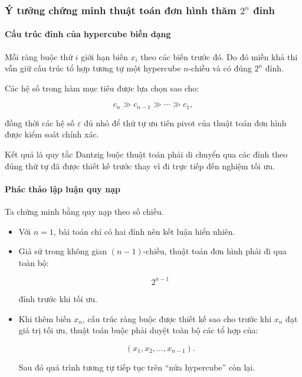 \documentclass[fontsize=13pt,a4paper]{report}
\begin{document}
\subsubsection{Ý tưởng chứng minh thuật toán đơn hình thăm \(2^n\) đỉnh}

\paragraph{Cấu trúc đỉnh của hypercube biến dạng}

Mỗi ràng buộc thứ \(i\) giới hạn biến \(x_i\) theo các biến trước đó. Do đó miền khả thi vẫn giữ cấu trúc tổ hợp tương tự một hypercube \(n\)-chiều và có đúng \(2^n\) đỉnh.

Các hệ số trong hàm mục tiêu được lựa chọn sao cho:

\[
c_n \gg c_{n-1} \gg \cdots \gg c_1,
\]

đồng thời các hệ số \(\varepsilon\) đủ nhỏ để thứ tự ưu tiên pivot của thuật toán đơn hình được kiểm soát chính xác.

Kết quả là quy tắc Dantzig buộc thuật toán phải di chuyển qua các đỉnh theo đúng thứ tự đã được thiết kế trước thay vì đi trực tiếp đến nghiệm tối ưu.

\paragraph{Phác thảo lập luận quy nạp}

Ta chứng minh bằng quy nạp theo số chiều.

\begin{itemize}

\item Với \(n=1\), bài toán chỉ có hai đỉnh nên kết luận hiển nhiên.

\item Giả sử trong không gian \((n-1)\)-chiều, thuật toán đơn hình phải đi qua toàn bộ:

\[
2^{n-1}
\]

đỉnh trước khi tối ưu.

\item Khi thêm biến \(x_n\), cấu trúc ràng buộc được thiết kế sao cho trước khi \(x_n\) đạt giá trị tối ưu, thuật toán buộc phải duyệt toàn bộ các tổ hợp của:

\[
(x_1,x_2,\dots,x_{n-1}).
\]

Sau đó quá trình tương tự tiếp tục trên ``nửa hypercube'' còn lại.

\end{itemize}
\end{document}
